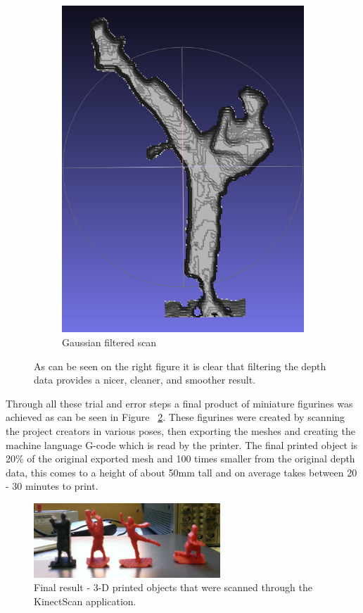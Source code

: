 \documentclass[pdftex,10.5pt]{report}
\begin{document}
\begin{figure}[H]
\begin{subfigure}[H]{0.4\textwidth}
		\includegraphics[width=\textwidth]{figures/filter}
		\caption{Gaussian filtered scan}
	\end{subfigure}
	\caption{As can be seen on the right figure it is clear that filtering the depth data provides 
		a nicer, cleaner, and smoother result.
	}
	\label{fig:filtering}
\end{figure}

Through all these trial and error steps a final product of miniature figurines was achieved as can be seen in Figure ~\ref{fig:actionfigures}. These figurines were created by scanning the project creators in various poses, then exporting the meshes and creating the machine language G-code which is read by the printer. The final printed object is 20\% of the original exported mesh and 100 times smaller from the original depth data, this comes to a height of about 50mm tall and on average takes between 20 - 30 minutes to print.

\begin{figure}[H]
	\centering
	\includegraphics[width=70mm]{figures/actionfigures.jpg}
	\caption{Final result - 3-D printed objects that were scanned through the KinectScan application.}
	\label{fig:actionfigures}
\end{figure}
\end{document}
